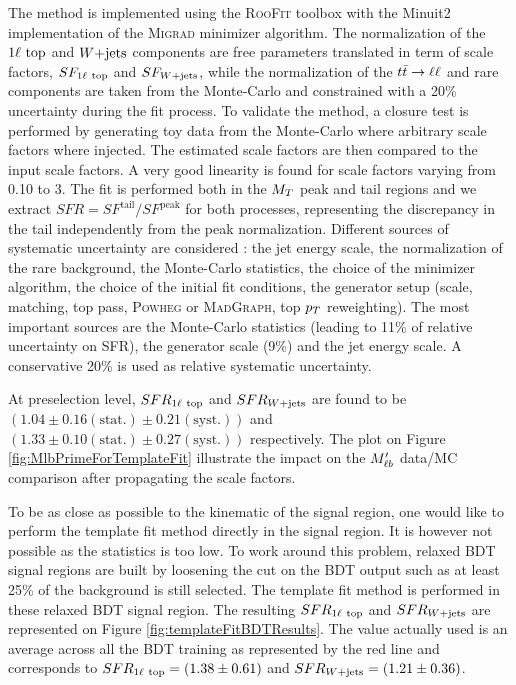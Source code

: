         The method is implemented using the \textsc{RooFit} toolbox with the Minuit2 implementation of the \textsc{Migrad} minimizer algorithm. The normalization of the $1\ell~\text{top}$ and $\text{$W$+jets}$ components are free parameters translated in term of scale factors, $SF_{1\ell~\text{top}}$ and $SF_{\text{$W$+jets}}$, while the normalization of the $t\bar{t} \rightarrow \ell \ell$ and rare components are taken from the Monte-Carlo and constrained with a 20\% uncertainty during the fit process. To validate the method, a closure test is performed by generating toy data from the Monte-Carlo where arbitrary scale factors where injected. The estimated scale factors are then compared to the input scale factors. A very good linearity is found for scale factors varying from 0.10 to 3. The fit is performed both in the $M_T$ peak and tail regions and we extract $SFR = SF^{\text{tail}} / SF^{\text{peak}}$ for both processes, representing the discrepancy in the tail independently from the peak normalization. Different sources of systematic uncertainty are considered : the jet energy scale, the normalization of the rare background, the Monte-Carlo statistics, the choice of the minimizer algorithm, the choice of the initial fit conditions, the generator setup (scale, matching, top pass, \textsc{Powheg} or \textsc{MadGraph}, top $p_T$ reweighting). The most important sources are the Monte-Carlo statistics (leading to 11\% of relative uncertainty on SFR), the generator scale (9\%) and the jet energy scale. A conservative 20\% is used as relative systematic uncertainty.

        At preselection level, $SFR_{1\ell~\text{top}}$ and $SFR_{\text{$W$+jets}}$ are found to be $(1.04 \pm 0.16 (\text{stat.}) \pm 0.21 (\text{syst.}))$ and $(1.33 \pm 0.10 (\text{stat.}) \pm 0.27 (\text{syst.}) )$ respectively. The plot on Figure \ref{fig:MlbPrimeForTemplateFit} illustrate the impact on the $M'_{\ell b}$ data/MC comparison after propagating the scale factors.

        To be as close as possible to the kinematic of the signal region, one would like to perform the template fit method directly in the signal region. It is however not possible as the statistics is too low. To work around this problem, relaxed BDT signal regions are built by loosening the cut on the BDT output such as at least 25\% of the background is still selected. The template fit method is performed in these relaxed BDT signal region. The resulting $SFR_{1\ell~\text{top}}$ and $SFR_{\text{$W$+jets}}$ are represented on Figure \ref{fig:templateFitBDTResults}. The value actually used is an average across all the BDT training as represented by the red line and corresponds to $SFR_{1\ell~\text{top}} = (1.38 \pm 0.61)$ and $SFR_{\text{$W$+jets}} = (1.21 \pm 0.36)$.

